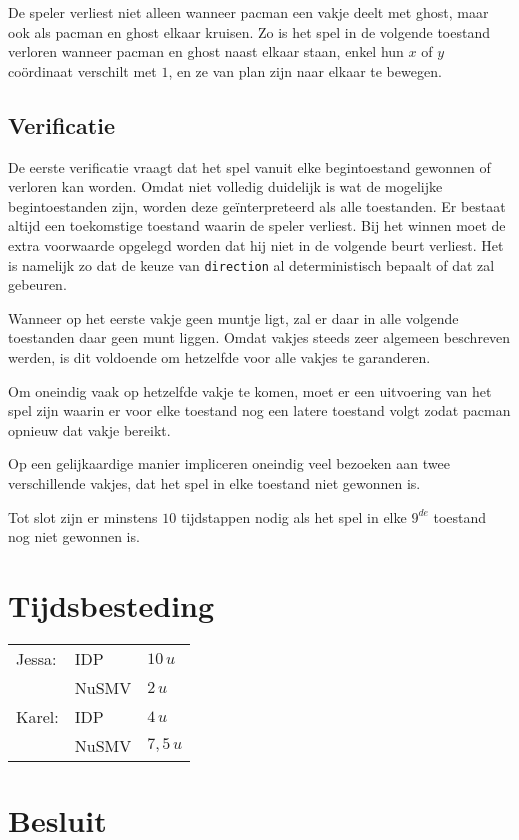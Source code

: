\documentclass[a4paper,12pt]{article}
\begin{document}
De speler verliest niet alleen wanneer pacman een vakje deelt met ghost,
maar ook als pacman en ghost elkaar kruisen.
Zo is het spel in de volgende toestand verloren wanneer pacman en ghost naast elkaar staan,
enkel hun $ x $ of $ y $ co\"ordinaat verschilt met $ 1 $, en ze van plan zijn naar elkaar te bewegen.

\subsection{Verificatie}
De eerste verificatie vraagt dat het spel vanuit elke begintoestand gewonnen of verloren kan worden.
Omdat niet volledig duidelijk is wat de mogelijke begintoestanden zijn,
worden deze ge\"interpreteerd als alle toestanden.
Er bestaat altijd een toekomstige toestand waarin de speler verliest.
Bij het winnen moet de extra voorwaarde opgelegd worden dat hij niet in de volgende beurt verliest.
Het is namelijk zo dat de keuze van \texttt{direction} al deterministisch bepaalt of dat zal gebeuren.

Wanneer op het eerste vakje geen muntje ligt, zal er daar in alle volgende toestanden daar geen munt liggen.
Omdat vakjes steeds zeer algemeen beschreven werden, is dit voldoende om hetzelfde voor alle vakjes te garanderen.

Om oneindig vaak op hetzelfde vakje te komen,
moet er een uitvoering van het spel zijn waarin er voor elke toestand nog een latere toestand volgt 
zodat pacman opnieuw dat vakje bereikt.

Op een gelijkaardige manier impliceren oneindig veel bezoeken aan twee verschillende vakjes,
dat het spel in elke toestand niet gewonnen is.

Tot slot zijn er minstens $ 10 $ tijdstappen nodig als het spel in elke $ 9^{de} $ toestand nog niet gewonnen is.

\section{Tijdsbesteding}
\begin{tabular}{l l l}
Jessa: 	& IDP 	& $ 10\,u $\\
		& NuSMV 	& $ 2\,u $\\
Karel: 	& IDP 	& $ 4\,u $\\
		& NuSMV 	& $ 7,5\,u $\\
\end{tabular}

\section{Besluit}
\end{document}
